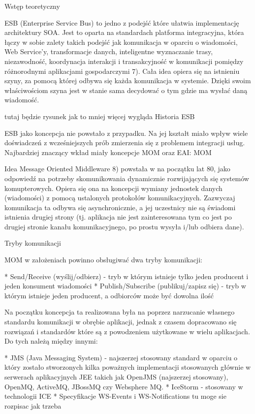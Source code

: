 Wstęp teoretyczny

ESB (Enterprise Service Bus) to jedno z podejść które ułatwia implementację architektury SOA. Jest to oparta na standardach platforma integracyjna, która łączy w sobie zalety takich podejść jak komunikacja w oparciu o wiadomości, Web Service'y, transformacje danych, inteligentne wyznaczanie trasy, niezawodność, koordynacja interakcji i transakcyjność w komunikacji pomiędzy różnorodnymi aplikacjami gospodarczymi 7). Cała idea opiera się na istnieniu szyny, za pomocą której odbywa się każda komunikacja w systemie. Dzięki swoim właściwościom szyna jest w stanie sama decydować o tym gdzie ma wysłać daną wiadomość.

tutaj będzie rysunek jak to mniej więcej wygląda
Historia ESB

ESB jako koncepcja nie powstało z przypadku. Na jej kształt miało wpływ wiele doświadczeń z wcześniejszych prób zmierzenia się z problemem integracji usług. Najbardziej znaczący wkład miały koncepcje MOM oraz EAI:
MOM

Idea Message Oriented Middleware 8) powstała w na początku lat 80, jako odpowiedź na potrzeby skomunikowania dynamicznie rozwijających się systemów komupterowych. Opiera się ona na koncepcji wymiany jednostek danych (wiadomości) z pomocą ustalonych protokołów komunikacyjnych. Zazwyczaj komunikacja ta odbywa się asynchronicznie, a jej uczestnicy nie są świadomi istnienia drugiej strony (tj. aplikacja nie jest zainteresowana tym co jest po drugiej stronie kanału komunikacyjnego, po prostu wysyła i/lub odbiera dane).

Tryby komunikacji

MOM w założeniach powinno obsługiwać dwa tryby komunikacji:

    *
	      Send/Receive (wyślij/odbierz) - tryb w którym istnieje tylko jeden producent i jeden konsument wiadomości
		      *
			        Publish/Subscribe (publikuj/zapisz się) - tryb w którym istnieje jeden producent, a odbiorców może być dowolna ilość

					Na początku koncepcja ta realizowana była na poprzez narzucanie własnego standardu komunikacji w obrębie aplikacji, jednak z czasem dopracowano się rozwiązań i standardów które są z powodzeniem użytkowane w wielu aplikacjach. Do tych należą między innymi:

					    *
						      JMS (Java Messaging System) - najszerzej stosowany standard w oparciu o który zostało stworzonych kilka poważnych implementacji stosowanych głównie w serwerach aplikacyjnych JEE takich jak OpenJMS (najszerzej stosowany), OpenMQ, ActiveMQ, JBossMQ czy Websphere MQ.
							      *
								        IceStorm - stosowany w technologii ICE
										    *
											      Specyfikacje WS-Events i WS-Notifications tu moge sie rozpisac jak trzeba

